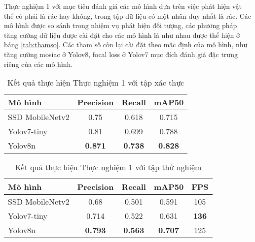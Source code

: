 \documentclass[../the.tex]{subfiles}
\begin{document}
{\fontsize{13}{12} \selectfont
Thực nghiệm 1 với mục tiêu đánh giá các mô hình dựa trên việc phát hiện vật thể có phải là rác hay không, trong tập dữ liệu có một nhãn duy nhất là rác.
Các mô hình được so sánh trong nhiệm vụ phát hiện đối tượng, các phương pháp tăng cường dữ liệu được cài đặt cho các mô hình là như nhau được thể hiện ở bảng \ref{tab:thamso}.
Các tham số còn lại cài đặt theo mặc định của mô hình, như tăng cường mosiac ở Yolov8, focal loss ở Yolov7 mục đích đánh giá đặc trưng riêng của các mô hình.

}
\begin{table}[ht!]
    \centering
    \caption{Kết quả thực hiện Thực nghiệm 1 với tập xác thực}
    \begin{tabular}{|l|c|c|c|}
        \hline
        \textbf{Mô hình}  & \textbf{Precision} & \textbf{Recall} & \textbf{mAP50} \\ \hline
        SSD   MobileNetv2 & 0.75               & 0.618           & 0.715          \\ \hline
        Yolov7-tiny       & 0.81               & 0.699           & 0.788          \\ \hline
        Yolov8n           & \textbf{0.871}     & \textbf{0.738}  & \textbf{0.828} \\ \hline
    \end{tabular}
    \label{tab:thucnghiem1.1}
\end{table}

\begin{table}[ht!]
    \centering
    \caption{Kết quả thực hiện Thực nghiệm 1 với tập thử nghiệm}
    \begin{tabular}{|l|c|c|c|c|}
        \hline
        \textbf{Mô hình}  & \textbf{Precision} & \textbf{Recall} & \textbf{mAP50} & \multicolumn{1}{l|}{\textbf{FPS}} \\ \hline
        SSD   MobileNetv2 & 0.68               & 0.501           & 0.591          & 105                               \\ \hline
        Yolov7-tiny       & 0.714              & 0.522           & 0.631          & \textbf{136}                      \\ \hline
        Yolov8n           & \textbf{0.793}     & \textbf{0.563}  & \textbf{0.707} & 125                               \\ \hline
    \end{tabular}
    \label{tab:thucnghiem1.2}
\end{table}

\bigskip
\end{document}
